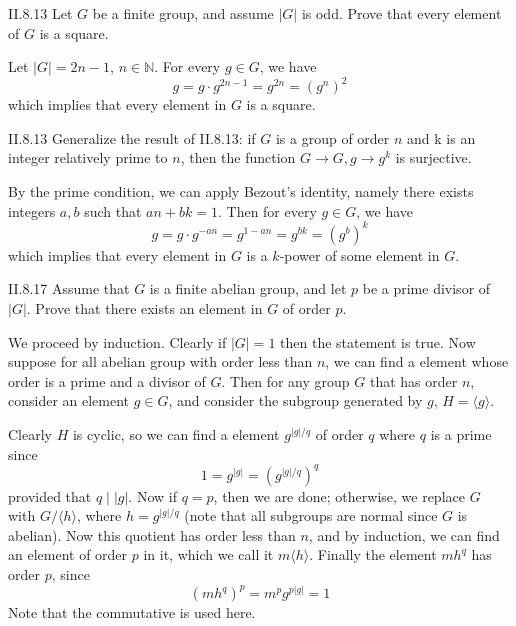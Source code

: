 \begin{problem}{II.8.13}
Let $G$ be a finite group, and assume $|G|$ is odd. Prove that every element of $G$ is a square.
\end{problem}
\begin{pf}
Let $|G|=2n-1$, $n \in \mathbb{N}$. For every $g \in G$, we have
\[
g = g \cdot g^{2n-1} = g^{2n} = (g^n)^2    
\]
which implies that every element in $G$ is a square.
\end{pf}

\begin{problem}{II.8.13}
Generalize the result of II.8.13: if $G$ is a group of order $n$ and k is an integer relatively prime to $n$, then the function $G \to G, g \to g^k$ is surjective.
\end{problem}
\begin{pf}
By the prime condition, we can apply Bezout's identity, namely there exists integers $a,b$ such that $an + bk = 1$. Then for every $g \in G$, we have
\[
g = g \cdot g^{-an} = g^{1-an} = g^{bk} = (g^b)^k    
\]
which implies that every element in $G$ is a $k$-power of some element in $G$.
\end{pf}    

\begin{problem}{II.8.17}
Assume that $G$ is a finite abelian group, and let $p$ be a prime divisor of $|G|$. Prove that there exists an element in $G$ of order $p$.
\end{problem}
\begin{pf}
We proceed by induction. Clearly if $|G| = 1$ then the statement is true. Now suppose for all abelian group with order less than $n$, we can find a element whose order is a prime and a divisor of $G$. Then for any group $G$ that has order $n$, consider an element $g \in G$, and consider the subgroup generated by $g$, $H = \langle g \rangle$. 

Clearly $H$ is cyclic, so we can find a element $g^{|g|/ q}$ of order $q$ where $q$ is a prime since
\[
1 = g^{|g|} = (g^{|g|/ q})^q
\]
provided that $q\;|\;|g|$. Now if $q = p$, then we are done; otherwise, we replace $G$ with $G/\langle h \rangle$, where $h = g^{|g|/ q}$ (note that all subgroups are normal since $G$ is abelian). Now this quotient has order less than $n$, and by induction, we can find an element of order $p$ in it, which we call it $m\langle h \rangle$. Finally the element $mh^{q}$ has order $p$, since
\[
(mh^{q})^p = m^pg^{p|g|} = 1
\]
Note that the commutative is used here.
\end{pf}

